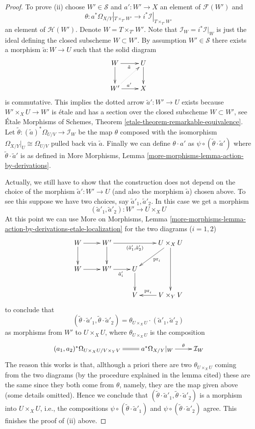 \begin{proof}
\medskip\noindent
To prove (ii) choose $W' \in \mathcal{S}$ and $a' : W' \to X$ an element
of $\mathcal{F}(W')$ and
$$
\theta :
a^*\Omega_{X/Y}|_{T \times_{T'} W'}
\longrightarrow
i^*\mathcal{I}|_{T \times_{T'} W'}
$$
an element of $\mathcal{H}(W')$. Denote $W = T \times_{T'} W'$.
Note that $\mathcal{I}_W = i^*\mathcal{I}|_W$ is just the ideal
defining the closed subscheme $W \subset W'$.
By assumption $W' \in \mathcal{S}$ there exists a morphism
$\tilde a : W \to U$ such that the solid diagram
$$
\xymatrix{
W \ar[r]_{\tilde a} \ar[d] & U \ar[d] \\
W' \ar[r]^{a'} \ar@{..>}[ru] & X
}
$$
is commutative. This implies the dotted arrow $\tilde a' : W' \to U$
exists because $W' \times_X U \to W'$ is \'etale and has a section over the
closed subscheme $W \subset W'$, see
\'Etale Morphisms of Schemes,
Theorem \ref{etale-theorem-remarkable-equivalence}.
Let $\tilde \theta : (\tilde a)^*\Omega_{U/V} \to \mathcal{I}_W$
be the map $\theta$ composed with the isomorphism
$\Omega_{X/Y}|_U \cong \Omega_{U/V}$ pulled back via $\tilde a$.
Finally we can define $\theta \cdot a'$ as
$\psi \circ (\tilde\theta \cdot \tilde a')$ where
$\tilde\theta \cdot \tilde a'$ is as defined in 
More Morphisms, Lemma \ref{more-morphisms-lemma-action-by-derivations}.

\medskip\noindent
Actually, we still have to show that the construction does not
depend on the choice of the morphism $\tilde a' : W' \to U$
(and also the morphism $\tilde a$) chosen above. To see this suppose
we have two choices, say $\tilde a'_1, \tilde a'_2$. In this case
we get a morphism
$$
(\tilde a'_1, \tilde a'_2) :
W'
\longrightarrow
U \times_X U
$$
At this point we can use
More on Morphisms,
Lemma \ref{more-morphisms-lemma-action-by-derivations-etale-localization}
for the two diagrams ($i = 1, 2$)
$$
\xymatrix{
W \ar[r] \ar[d] & W' \ar[rr]_-{(\tilde a_1', \tilde a_2')} \ar[d] & &
U \times_X U \ar[dd] \ar[ld]^{\text{pr}_i} \\
W \ar[r] & W' \ar[r]_{\tilde a_i'} & U \ar[d] & \\
& & V & V \times_Y V \ar[l]_-{\text{pr}_i}
}
$$
to conclude that
$$
(\tilde \theta \cdot \tilde a'_1, \tilde \theta \cdot \tilde a'_2)
=
\theta_{U \times_X U} \cdot (\tilde a'_1, \tilde a'_2)
$$
as morphisms from $W'$ to $U \times_X U$, where $\theta_{U \times_X U}$
is the composition
$$
\xymatrix{
(a_1, a_2)^*\Omega_{U \times_X U/V \times_Y V}
\ar@{=}[r] &
a^*\Omega_{X/Y}|_W \ar[r]^-{\theta} &
\mathcal{I}_W
}
$$
The reason this works is that, allthough a priori there are two
$\theta_{U \times_X U}$ coming from the two diagrams (by the procedure
explained in the lemma cited) these are the same since they
both come from $\theta$, namely, they are the map given above (some details
omitted). Hence we conclude that
$(\tilde \theta \cdot \tilde a'_1, \tilde \theta \cdot \tilde a'_2)$
is a morphism into $U \times_X U$, i.e., the compositions
$\psi \circ (\tilde \theta \cdot \tilde a'_1)$ and
$\psi \circ (\tilde \theta \cdot \tilde a'_2)$ agree. This finishes
the proof of (ii) above.


\end{proof}
